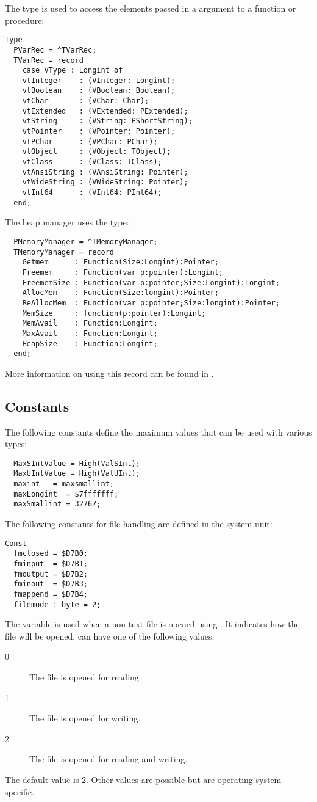 The  type is used to access the elements passed in a  argument to a function or procedure:
\begin{verbatim}
Type
  PVarRec = ^TVarRec;
  TVarRec = record
    case VType : Longint of
    vtInteger    : (VInteger: Longint);
    vtBoolean    : (VBoolean: Boolean);
    vtChar       : (VChar: Char);
    vtExtended   : (VExtended: PExtended);
    vtString     : (VString: PShortString);
    vtPointer    : (VPointer: Pointer);
    vtPChar      : (VPChar: PChar);
    vtObject     : (VObject: TObject);
    vtClass      : (VClass: TClass);
    vtAnsiString : (VAnsiString: Pointer);
    vtWideString : (VWideString: Pointer);
    vtInt64      : (VInt64: PInt64);
  end;
\end{verbatim}
The heap manager uses the  type:
\begin{verbatim}
  PMemoryManager = ^TMemoryManager;
  TMemoryManager = record
    Getmem      : Function(Size:Longint):Pointer;
    Freemem     : Function(var p:pointer):Longint;
    FreememSize : Function(var p:pointer;Size:Longint):Longint;
    AllocMem    : Function(Size:longint):Pointer;
    ReAllocMem  : Function(var p:pointer;Size:longint):Pointer;
    MemSize     : function(p:pointer):Longint;
    MemAvail    : Function:Longint;
    MaxAvail    : Function:Longint;
    HeapSize    : Function:Longint;
  end;
\end{verbatim}
More information on using this record can be found in \progref.

\subsection{Constants}
The following constants define the maximum values that can be used with
various types:
\begin{verbatim}
  MaxSIntValue = High(ValSInt);
  MaxUIntValue = High(ValUInt);
  maxint   = maxsmallint;
  maxLongint  = $7fffffff;
  maxSmallint = 32767;
\end{verbatim}
The following constants for file-handling are defined in the system unit:
\begin{verbatim}
Const
  fmclosed = $D7B0;
  fminput  = $D7B1;
  fmoutput = $D7B2;
  fminout  = $D7B3;
  fmappend = $D7B4;
  filemode : byte = 2;
\end{verbatim}

The  variable is used when a non-text file is opened using
. It indicates how the file will be opened.  can have one of
the following values:
\begin{description}
\item[0] The file is opened for reading.
\item[1] The file is opened for writing.
\item[2] The file is opened for reading and writing.
\end{description}
The default value is 2. Other values are possible but are operating system specific.

